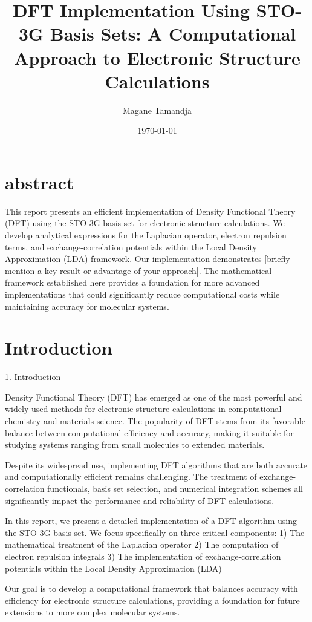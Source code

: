 \documentclass{article}
\title{DFT Implementation Using STO-3G Basis Sets: 
A Computational Approach to Electronic Structure Calculations}
\author{Magane Tamandja}
\date{\today}
\begin{document}
\maketitle

\section{abstract}
This report presents an efficient implementation of Density Functional Theory (DFT) using the STO-3G basis set for electronic structure calculations. We develop analytical expressions for the Laplacian operator,
 electron repulsion terms, and exchange-correlation potentials within the Local Density Approximation (LDA) framework. Our implementation demonstrates [briefly mention a key result or advantage of your approach].
 The mathematical framework established here provides a foundation for more advanced implementations that could significantly reduce computational costs while maintaining accuracy for molecular systems.

\section{Introduction}
1. Introduction

Density Functional Theory (DFT) has emerged as one of the most powerful and widely used methods for electronic structure calculations in computational chemistry and materials science. The popularity of 
DFT stems from its favorable balance between computational efficiency and accuracy, making it suitable for studying systems ranging from small molecules to extended materials. 

Despite its widespread use, implementing DFT algorithms that are both accurate and computationally efficient remains challenging. The treatment of exchange-correlation functionals,
 basis set selection, and numerical integration schemes all significantly impact the performance and reliability of DFT calculations.

In this report, we present a detailed implementation of a DFT algorithm using the STO-3G basis set. We focus specifically on three critical components:
1) The mathematical treatment of the Laplacian operator
2) The computation of electron repulsion integrals
3) The implementation of exchange-correlation potentials within the Local Density Approximation (LDA)

Our goal is to develop a computational framework that balances accuracy with efficiency for electronic structure calculations, providing a foundation for future extensions to more complex molecular systems.
\end{document}

